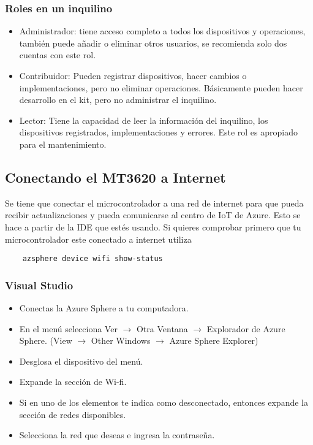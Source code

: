 \subsubsection{Roles en un inquilino}
\begin{itemize}
	\item 
	Administrador: tiene acceso completo a todos los dispositivos y operaciones, también puede añadir o eliminar otros usuarios, se recomienda solo dos cuentas con este rol.
	\item 
	Contribuidor: Pueden registrar dispositivos, hacer cambios o implementaciones, pero no eliminar operaciones. Básicamente pueden hacer desarrollo en el kit, pero no administrar el inquilino.
	\item 
	Lector: Tiene la capacidad de leer la información del inquilino, los dispositivos registrados, implementaciones y errores. Este rol es apropiado para el mantenimiento.
	
\end{itemize}

\subsection{Conectando el MT3620 a Internet}
Se tiene que conectar el microcontrolador a una red de internet para que pueda recibir actualizaciones y pueda comunicarse al centro de IoT de Azure. Esto se hace a partir de la IDE que estés usando.
Si quieres comprobar primero que tu microcontrolador este conectado a internet utiliza

\begin{verbatim}
	azsphere device wifi show-status
\end{verbatim}

\subsubsection{Visual Studio}
\begin{itemize}
	\item
	Conectas la Azure Sphere a tu computadora.
	\item 
	En el menú selecciona Ver $\rightarrow$ Otra Ventana $\rightarrow$ Explorador de Azure Sphere.
	(View $\rightarrow$ Other Windows $\rightarrow$ Azure Sphere Explorer)
	\item 
	Desglosa el dispositivo del menú. 
	\item 
	Expande la sección de Wi-fi.
	\item 
	Si en uno de los elementos te indica como desconectado, entonces expande la sección de redes disponibles.
	\item 
	Selecciona la red que deseas e ingresa la contraseña.
\end{itemize}

